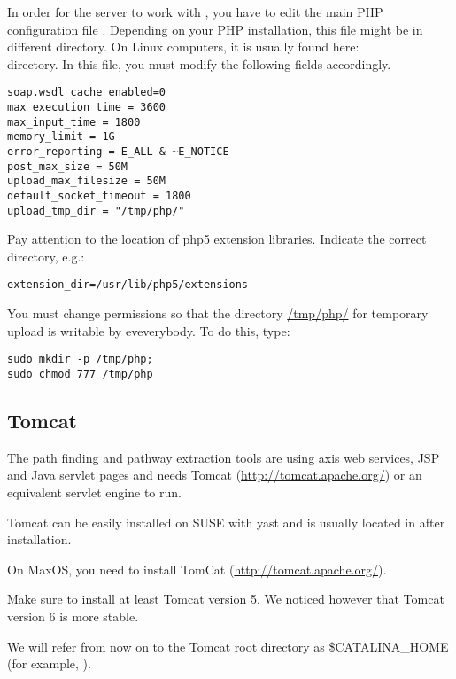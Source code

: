 \documentclass{book}
\begin{document}
In order for the server to work with \neat, you have to edit the main
PHP configuration file . Depending on your PHP
installation, this file might be in different directory. On Linux
computers, it is usually found here: \\
directory. In this file, you must modify the following fields
accordingly.

\begin{lstlisting}
soap.wsdl_cache_enabled=0
max_execution_time = 3600
max_input_time = 1800
memory_limit = 1G
error_reporting = E_ALL & ~E_NOTICE
post_max_size = 50M
upload_max_filesize = 50M
default_socket_timeout = 1800
upload_tmp_dir = "/tmp/php/"
\end{lstlisting}

Pay attention to the location of php5 extension libraries. Indicate
the correct directory, e.g.:

\begin{lstlisting}
extension_dir=/usr/lib/php5/extensions
\end{lstlisting}

You must change permissions so that the directory \url{/tmp/php/} for
temporary upload is writable by eveverybody. To do this, type:

\begin{lstlisting}
sudo mkdir -p /tmp/php; 
sudo chmod 777 /tmp/php
\end{lstlisting}


\subsection{Tomcat}

The path finding and pathway extraction tools are using axis web
services, JSP and Java servlet pages and needs Tomcat
(\url{http://tomcat.apache.org/}) or an equivalent servlet engine to
run.  

Tomcat can be easily installed on SUSE with yast and is usually
located in  after installation.

On MaxOS, you need to install TomCat
(\url{http://tomcat.apache.org/}).

Make sure to install at least Tomcat version 5.  We noticed however
that Tomcat version 6 is more stable.  

We will refer from now on to the Tomcat root directory as
\$CATALINA\_HOME (for example, ).
\end{document}
